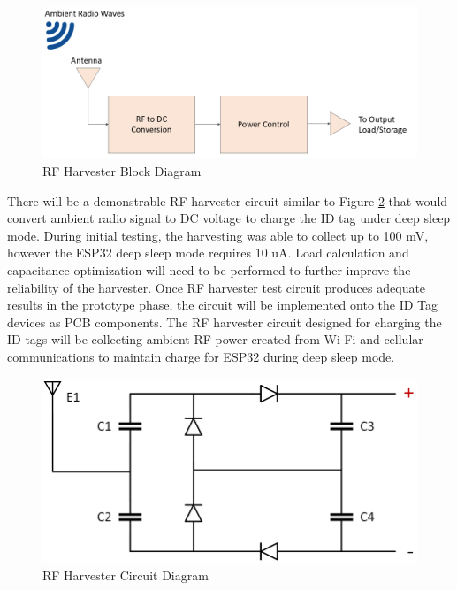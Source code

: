 \medskip
\begin{figure}[H]
\centering
    \includegraphics[scale=0.55]{./images/RF_H.png}
    \caption{RF Harvester Block Diagram}
    \label{rf_bd}
\end{figure}

There will be a demonstrable RF harvester circuit similar to Figure \ref{rf_c} that would convert ambient radio signal to DC voltage to charge the ID tag under deep sleep mode. During initial testing, the harvesting was able to collect up to 100 mV, however the ESP32 deep sleep mode requires 10 uA. Load calculation and capacitance optimization will need to be performed to further improve the reliability of the harvester. Once RF harvester test circuit produces adequate results in the prototype phase, the circuit will be implemented onto the ID Tag devices as PCB components. The RF harvester circuit designed for charging the ID tags will be collecting ambient RF power created from Wi-Fi and cellular communications to maintain charge for ESP32 during deep sleep mode.

\medskip
\begin{figure}[H]
\centering
    \includegraphics[scale=0.5]{./images/rf_circuit.png}
    \caption{RF Harvester Circuit Diagram}
    \label{rf_c}
\end{figure}

\pagebreak
